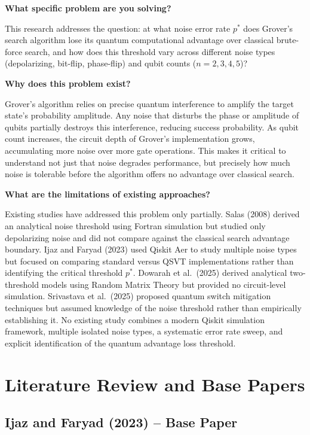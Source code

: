 \documentclass[12pt, a4paper]{article}
\begin{document}
\textbf{What specific problem are you solving?}

This research addresses the question: at what noise error rate $p^{*}$ does
Grover's search algorithm lose its quantum computational advantage over classical
brute-force search, and how does this threshold vary across different noise types
(depolarizing, bit-flip, phase-flip) and qubit counts ($n = 2, 3, 4, 5$)?

\textbf{Why does this problem exist?}

Grover's algorithm relies on precise quantum interference to amplify the target
state's probability amplitude. Any noise that disturbs the phase or amplitude of
qubits partially destroys this interference, reducing success probability. As qubit
count increases, the circuit depth of Grover's implementation grows, accumulating
more noise over more gate operations. This makes it critical to understand not just
that noise degrades performance, but precisely how much noise is tolerable before
the algorithm offers no advantage over classical search.

\textbf{What are the limitations of existing approaches?}

Existing studies have addressed this problem only partially. Salas (2008) derived
an analytical noise threshold using Fortran simulation but studied only depolarizing
noise and did not compare against the classical search advantage boundary. Ijaz and
Faryad (2023) used Qiskit Aer to study multiple noise types but focused on comparing
standard versus QSVT implementations rather than identifying the critical threshold
$p^{*}$. Dowarah et al.\ (2025) derived analytical two-threshold models using
Random Matrix Theory but provided no circuit-level simulation. Srivastava et al.\
(2025) proposed quantum switch mitigation techniques but assumed knowledge of the
noise threshold rather than empirically establishing it. No existing study combines
a modern Qiskit simulation framework, multiple isolated noise types, a systematic
error rate sweep, and explicit identification of the quantum advantage loss
threshold.

\section{Literature Review and Base Papers}

\subsection*{Ijaz and Faryad (2023) -- Base Paper}
\end{document}
